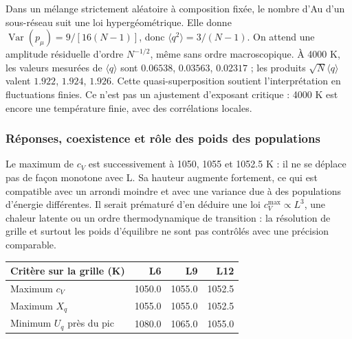 
Dans un mélange strictement aléatoire à composition fixée, le nombre d’Au d’un sous-réseau suit une loi hypergéométrique. Elle donne $\operatorname{Var}(p_\mu)=9/[16(N-1)]$, donc $\langle q^2\rangle=3/(N-1)$. On attend une amplitude résiduelle d’ordre $N^{-1/2}$, même sans ordre macroscopique. À 4000 K, les valeurs mesurées de $\langle q\rangle$ sont $0.06538$, $0.03563$, $0.02317$ ; les produits $\sqrt N\langle q\rangle$ valent $1.922$, $1.924$, $1.926$. Cette quasi-superposition soutient l’interprétation en fluctuations finies. Ce n’est pas un ajustement d’exposant critique : 4000 K est encore une température finie, avec des corrélations locales.

\subsubsection{Réponses, coexistence et rôle des poids des populations}

Le maximum de $c_V$ est successivement à 1050, 1055 et 1052.5 K : il ne se déplace pas de façon monotone avec L. Sa hauteur augmente fortement, ce qui est compatible avec un arrondi moindre et avec une variance due à des populations d’énergie différentes. Il serait prématuré d’en déduire une loi $c_V^{\max}\propto L^3$, une chaleur latente ou un ordre thermodynamique de transition : la résolution de grille et surtout les poids d’équilibre ne sont pas contrôlés avec une précision comparable.

\begin{center}\small\begin{tabular}{lrrr}\toprule

Critère sur la grille (K) & L6 & L9 & L12\\\midrule

Maximum $c_V$ & 1050.0 & 1055.0 & 1052.5\\

Maximum $X_q$ & 1055.0 & 1055.0 & 1052.5\\

Minimum $U_q$ près du pic & 1080.0 & 1065.0 & 1055.0\\

\bottomrule\end{tabular}\end{center}

